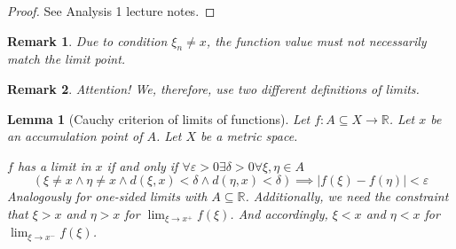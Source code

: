 \documentclass{article}
\newtheorem{lemma}{Lemma}  \numberwithin{lemma}{section}
\newtheorem{remark}{Remark}  \numberwithin{remark}{section}
\newcommand{\card}[1]{\left|#1\right|}
\begin{document}
\begin{proof}
  See Analysis 1 lecture notes.
\end{proof}

\begin{remark}
  Due to condition $\xi_n \neq x$, the function value must not necessarily match the limit point.
\end{remark}

\begin{remark}
  Attention! We, therefore, use two different definitions of limits.
\end{remark}

\begin{lemma}[Cauchy criterion of limits of functions] %
  \label{cauchy-crit}
  Let $f: A \subseteq X \to \mathbb R$. Let $x$ be an accumulation point of $A$.
  Let $X$ be a metric space.

  \emph{$f$ has a limit in $x$} if and only if $\forall \varepsilon > 0 \exists \delta > 0 \forall \xi, \eta \in A$
  \[
    (\xi \neq x \land \eta \neq x \land d(\xi, x) < \delta \land d(\eta, x) < \delta)
    \implies \card{f(\xi) - f(\eta)} < \varepsilon
  \]
  Analogously for one-sided limits with $A \subseteq \mathbb R$.
  Additionally, we need the constraint that $\xi > x$ and $\eta > x$ for $\lim_{\xi \to x^+} f(\xi)$.
  And accordingly, $\xi < x$ and $\eta < x$ for $\lim_{\xi \to x^-} f(\xi)$.
\end{lemma}
\end{document}
